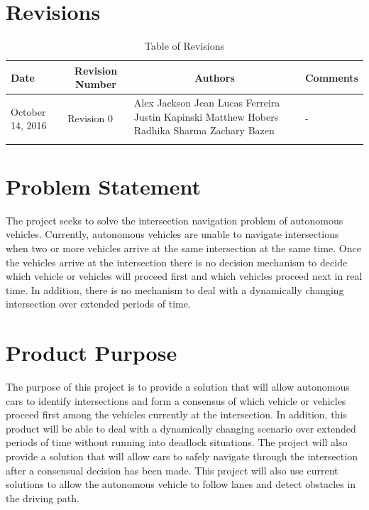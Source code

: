 \documentclass [12pt]{article}
\begin{document}

\tableofcontents
\listoftables

\pagebreak


\section{Revisions}
\begin{longtable}{| p{ } | p{ } | p{ } | p{ } |}

\hline 
\centering \textbf{Date} & 
\multicolumn{1}{c}{\textbf {Revision Number}} &
\multicolumn{1}{|c}{\textbf {Authors}} & 
\multicolumn{1}{|c|}{\textbf {Comments}} \\ \hline

\multirow{4}{*}{\centering October 14, 2016}  & 
\multirow{4}{*}{Revision 0}& 
{Alex Jackson \newline
		Jean Lucas Ferreira \newline
		Justin Kapinski\newline
		Matthew Hobers\newline
		Radhika Sharma\newline
		Zachary Bazen}
 &
\multirow{4}{*}{-} \\ 
\hline 

\caption{Table of Revisions} 
\end{longtable}



\pagebreak

\section{Problem Statement}
The project seeks to solve the intersection navigation problem of autonomous vehicles. Currently, autonomous vehicles are unable to navigate intersections when two or more vehicles arrive at the same intersection at the same time. Once the vehicles arrive at the intersection there is no decision mechanism to decide which vehicle or vehicles will proceed first and which vehicles proceed next in real time. In addition, there is no mechanism to deal with a dynamically changing intersection over extended periods of time.

\section{Product Purpose}
The purpose of this  project is to provide a solution that will allow autonomous cars to identify intersections and form a consensus of which vehicle or vehicles proceed first among the vehicles currently at the  intersection. In addition, this product will be able to deal with a dynamically changing scenario over extended periods of time without running into deadlock situations. The project will also provide a solution that will allow cars to safely navigate through the intersection after a consensual decision has been made. This project will also use current solutions to allow the autonomous vehicle to follow lanes and detect obstacles in the driving path. 
\end{document}
